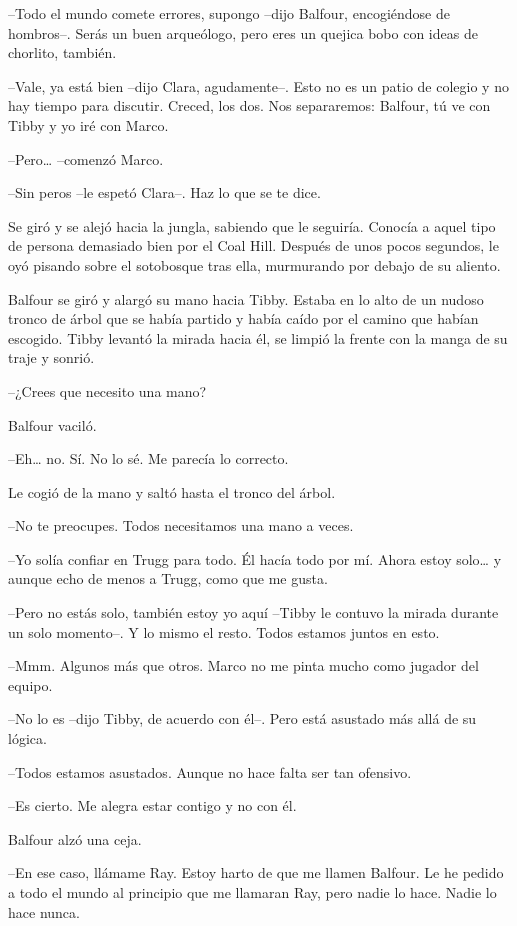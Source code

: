 {--Todo el mundo comete errores, supongo --dijo Balfour, encogiéndose de
 hombros--. Serás un buen arqueólogo, pero eres un quejica bobo con ideas
de chorlito, también.}

{--Vale, ya está bien --dijo Clara, agudamente--. Esto no es un patio de
 colegio y no hay tiempo para discutir. Creced, los dos. Nos separaremos:
Balfour, tú ve con Tibby y yo iré con Marco.}

{--Pero\ldots{} --comenzó Marco.}

{--Sin peros --le espetó Clara--. Haz lo que se te dice.}

{Se giró y se alejó hacia la jungla, sabiendo que le seguiría. Conocía a
 aquel tipo de persona demasiado bien por el Coal Hill. Después de unos
 pocos segundos, le oyó pisando sobre el sotobosque tras ella, murmurando
 por debajo de su aliento.}

{Balfour se giró y alargó su
 mano hacia Tibby. Estaba en lo alto de un nudoso tronco de árbol que se
 había partido y había caído por el camino que habían escogido. Tibby
 levantó la mirada hacia él, se limpió la frente con la manga de su traje
y sonrió.}

{--¿Crees que necesito una mano?}

{Balfour vaciló.}

{--Eh\ldots{} no. Sí. No lo sé. Me parecía lo correcto.}

{Le cogió de la mano y saltó hasta el tronco del árbol.}

{--No te preocupes. Todos necesitamos una mano a veces.}

{--Yo solía confiar en Trugg para todo. Él hacía todo por mí. Ahora estoy
 solo\ldots{} y aunque echo de menos a Trugg, como que me gusta.}

{--Pero no estás solo, también estoy yo aquí --Tibby le contuvo la mirada
 durante un solo momento--. Y lo mismo el resto. Todos estamos juntos en
esto.}

{--Mmm. Algunos más que otros. Marco no me pinta mucho como jugador del
equipo.}

{--No lo es --dijo Tibby, de acuerdo con él--. Pero está asustado más
allá de su lógica.}

{--Todos estamos asustados. Aunque no hace falta ser tan ofensivo.}

{--Es cierto. Me alegra estar contigo y no con él.}

{Balfour alzó una ceja.}

{--En ese caso, llámame Ray. Estoy harto de que me llamen Balfour. Le he
 pedido a todo el mundo al principio que me llamaran Ray, pero nadie lo
hace. Nadie lo hace nunca.}

